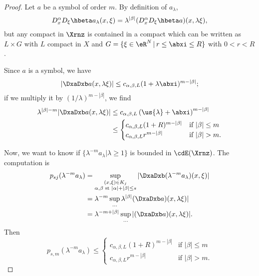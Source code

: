 \begin{proof}
Let $a$ be a symbol of order $m$. By definition of $a_{\lambda}$,
\[
  D_x^{\alpha} D_{\xi}\hbeta a_{\lambda}(x,\xi)=\lambda^{|\beta|}(D_x^{\alpha} D_{\xi}\hbeta a)(x,\lambda\xi),
\]
but any compact in $\Xrnz$ is contained in a compact which can be written as $L\times G$ with $L$ compact in $X$ and $G=\{\xi\in\eR^N\,|\, r\leq\abxi\leq R\}$ with $0<r<R$.

Since $a$ is a symbol, we have
\[
   |\DxaDxb a(x,\lambda\xi)|\leq  c_{\alpha,\beta,L}(1+\lambda\abxi)^{m-|\beta|};
\]
if we multiply it by $(1/\lambda)^{m-|\beta|}$, we find
\begin{equation}
\begin{split}
  \lambda^{|\beta|-m}|\DxaDxb a(x,\lambda\xi)|
     &\leq c_{\alpha,\beta,L}\left(\us{\lambda}+\abxi\right)^{m-|\beta|}\\
     &\leq \begin{cases}
                   c_{\alpha,\beta,L}(1+R)^{m-|\beta|} &\text{if }|\beta|\leq m\\
		   c_{\alpha,\beta,L}r^{m-|\beta|}     &\text{if }|\beta|> m.
           \end{cases}
\end{split}
\end{equation}

Now, we want to know if $\{ \lambda^{-m}a_{\lambda}|\lambda\geq 1 \}$ is bounded in $\cdE(\Xrnz)$. The computation is
\begin{equation}
\begin{split}
    p_{sj}(\lambda^{-m}a_{\lambda})&=\sup_{ \substack{(x,\xi)\in K_j\\ \alpha,\beta\text{ st } |\alpha|+|\beta|\leq s }}|\DxaDxb(\lambda^{-m}a_{\lambda})(x,\xi)|\\
                       &=\lambda^{-m}\sup_{\ldots}\lambda^{|\beta|}(\DxaDxb a)(x,\lambda\xi)|\\
		       &=\lambda^{-m+|\beta|}\sup_{\ldots}|(\DxaDxb a)(x,\lambda\xi)|.
\end{split}
\end{equation}
Then
\begin{equation}
p_{s,m}(\lambda^{-m} a_{\lambda})\leq \begin{cases}
                   c_{\alpha,\beta,L}(1+R)^{m-|\beta|} &\text{if }|\beta|\leq m\\
		   c_{\alpha,\beta,L}r^{m-|\beta|}     &\text{if }|\beta|> m.
           \end{cases}
\end{equation}


\end{proof}
